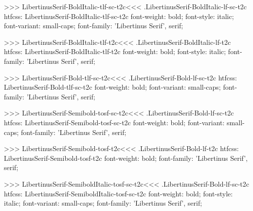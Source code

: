 {{{{{{{{{{{{{{{{>>>
\<LibertinusSerif-BoldItalic-tlf-sc-t2c\><<<
.LibertinusSerif-BoldItalic-lf-sc-t2c
htfcss:  LibertinusSerif-BoldItalic-tlf-sc-t2c  font-weight: bold; font-style: italic; font-variant: small-caps; font-family: 'Libertinus Serif', serif;

>>>
\<LibertinusSerif-BoldItalic-tlf-t2c\><<<
.LibertinusSerif-BoldItalic-lf-t2c
htfcss:  LibertinusSerif-BoldItalic-tlf-t2c  font-weight: bold; font-style: italic; font-family: 'Libertinus Serif', serif;

>>>
\<LibertinusSerif-Bold-tlf-sc-t2c\><<<
.LibertinusSerif-Bold-lf-sc-t2c
htfcss:  LibertinusSerif-Bold-tlf-sc-t2c  font-weight: bold; font-variant: small-caps; font-family: 'Libertinus Serif', serif;

>>>
\<LibertinusSerif-Semibold-tosf-sc-t2c\><<<
.LibertinusSerif-Bold-lf-sc-t2c
htfcss:  LibertinusSerif-Semibold-tosf-sc-t2c  font-weight: bold; font-variant: small-caps; font-family: 'Libertinus Serif', serif;

>>>
\<LibertinusSerif-Semibold-tosf-t2c\><<<
.LibertinusSerif-Bold-lf-t2c
htfcss:  LibertinusSerif-Semibold-tosf-t2c  font-weight: bold; font-family: 'Libertinus Serif', serif;

>>>
\<LibertinusSerif-SemiboldItalic-tosf-sc-t2c\><<<
.LibertinusSerif-Bold-lf-sc-t2c
htfcss:  LibertinusSerif-SemiboldItalic-tosf-sc-t2c  font-weight: bold; font-style: italic; font-variant: small-caps; font-family: 'Libertinus Serif', serif;

}}}}}}}}}}}}}}}}
